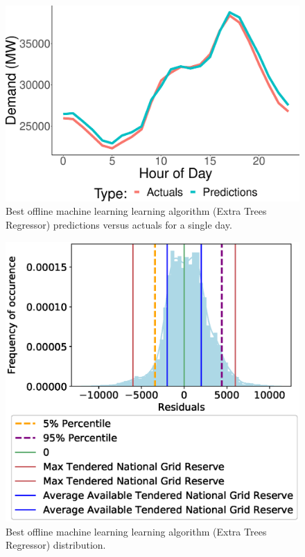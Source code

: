 \documentclass[final,3p,times,twocolumn,numbers]{elsarticle}
\begin{document}
\begin{figure}
\centering
\includegraphics[width=\columnwidth]{figures/results/best_offline_learning_day_simulation.eps}
\caption{Best offline machine learning learning algorithm (Extra Trees Regressor) predictions versus actuals for a single day.}
\label{fig:best_offline_learning_day_simulation}
\end{figure}


\begin{figure}
\centering
\includegraphics[width=\columnwidth]{figures/results/ExtraTreesRegressor_distribution_plot.eps}
\caption{Best offline machine learning learning algorithm (Extra Trees Regressor) distribution.}
\label{fig:best_offline_learning_day_distribution}
\end{figure}
\end{document}
